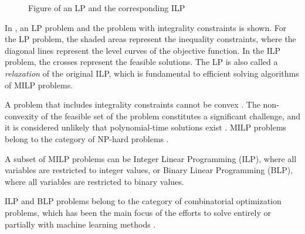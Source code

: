 \begin{figure}
    \caption{Figure of an \Gls{LP} and the corresponding \Gls{ILP}}
    \label{fig:milpfig}
\end{figure}

In , an \gls{LP} problem and the problem with integrality constraints is shown. For the LP problem, the shaded areas represent the inequality constraints, where the diagonal lines represent the level curves of the objective function. In the \gls{ILP} problem, the crosses represent the feasible solutions. The LP is also called a \textit{relaxation} of the original \gls{ILP}, which is fundamental to efficient solving algorithms of \gls{MILP} problems.

A problem that includes integrality constraints cannot be convex \cite{wolsey2020integer}. The non-convexity of the feasible set of the problem constitutes a significant challenge, and it is considered unlikely that polynomial-time solutions exist \cite{papadimitriou1982combinatorial}. \gls{MILP} problems belong to the category of \gls{NP}-hard problems \cite{papadimitriou1982combinatorial}.   



A subset of \gls{MILP} problems can be Integer Linear Programming (\gls{ILP}), where all variables are restricted to integer values, or Binary Linear Programming (\gls{BLP}), where all variables are restricted to binary values. 

\gls{ILP} and \gls{BLP} problems belong to the category of combinatorial optimization problems, which has been the main focus of the efforts to solve entirely or partially with machine learning methods \cite{bengio2020machine}. 


